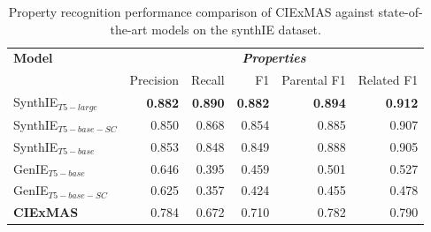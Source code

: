 \documentclass[a4paper,oneside,bibliography=totoc]{scrbook}
\begin{document}
\begin{table}[h]
  \centering
  \begin{tabular}{l|rrrrr}
    \toprule
    \textbf{Model}         & \multicolumn{5}{c}{\textit{\textbf{Properties}}}                                                                     \\
                           & Precision                                        & Recall         & F1             & Parental F1    & Related F1     \\
    \midrule
    SynthIE$_{T5-large}$   & \textbf{0.882}                                   & \textbf{0.890} & \textbf{0.882} & \textbf{0.894} & \textbf{0.912} \\
    SynthIE$_{T5-base-SC}$ & 0.850                                            & 0.868          & 0.854          & 0.885          & 0.907          \\
    SynthIE$_{T5-base}$    & 0.853                                            & 0.848          & 0.849          & 0.888          & 0.905          \\
    GenIE$_{T5-base}$      & 0.646                                            & 0.395          & 0.459          & 0.501          & 0.527          \\
    GenIE$_{T5-base-SC}$   & 0.625                                            & 0.357          & 0.424          & 0.455          & 0.478          \\
    \midrule
    \textbf{CIExMAS}       & 0.784                                            & 0.672          & 0.710          & 0.782          & 0.790          \\
    \bottomrule
  \end{tabular}
  \caption{Property recognition performance comparison of CIExMAS against state-of-the-art models on the synthIE dataset.}
  \label{tab:evaluation_properties}
\end{table}
\end{document}
